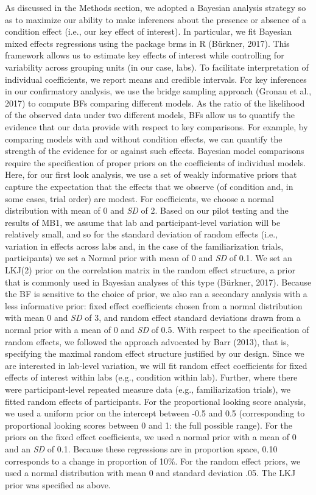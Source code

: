 \documentclass[
  english,
  man,floatsintext]{apa6}
\begin{document}
As discussed in the Methods section, we adopted a Bayesian analysis strategy so as to maximize our ability to make inferences about the presence or absence of a condition effect (i.e., our key effect of interest). In particular, we fit Bayesian mixed effects regressions using the package brms in R (Bürkner, 2017). This framework allows us to estimate key effects of interest while controlling for variability across grouping units (in our case, labs).
To facilitate interpretation of individual coefficients, we report means and credible intervals. For key inferences in our confirmatory analysis, we use the bridge sampling approach (Gronau et al., 2017) to compute BFs comparing different models. As the ratio of the likelihood of the observed data under two different models, BFs allow us to quantify the evidence that our data provide with respect to key comparisons. For example, by comparing models with and without condition effects, we can quantify the strength of the evidence for or against such effects.
Bayesian model comparisons require the specification of proper priors on the coefficients of individual models. Here, for our first look analysis, we use a set of weakly informative priors that capture the expectation that the effects that we observe (of condition and, in some cases, trial order) are modest. For coefficients, we choose a normal distribution with mean of 0 and \emph{SD} of 2. Based on our pilot testing and the results of MB1, we assume that lab and participant-level variation will be relatively small, and so for the standard deviation of random effects (i.e., variation in effects across labs and, in the case of the familiarization trials, participants) we set a Normal prior with mean of 0 and \emph{SD} of 0.1. We set an LKJ(2) prior on the correlation matrix in the random effect structure, a prior that is commonly used in Bayesian analyses of this type (Bürkner, 2017). Because the BF is sensitive to the choice of prior, we also ran a secondary analysis with a less informative prior: fixed effect coefficients chosen from a normal distribution with mean 0 and \emph{SD} of 3, and random effect standard deviations drawn from a normal prior with a mean of 0 and \emph{SD} of 0.5. With respect to the specification of random effects, we followed the approach advocated by Barr (2013), that is, specifying the maximal random effect structure justified by our design. Since we are interested in lab-level variation, we will fit random effect coefficients for fixed effects of interest within labs (e.g., condition within lab). Further, where there were participant-level repeated measure data (e.g., familiarization trials), we fitted random effects of participants.
For the proportional looking score analysis, we used a uniform prior on the intercept between -0.5 and 0.5 (corresponding to proportional looking scores between 0 and 1: the full possible range). For the priors on the fixed effect coefficients, we used a normal prior with a mean of 0 and an \emph{SD} of 0.1. Because these regressions are in proportion space, 0.10 corresponds to a change in proportion of 10\%. For the random effect priors, we used a normal distribution with mean 0 and standard deviation .05. The LKJ prior was specified as above.
\end{document}
